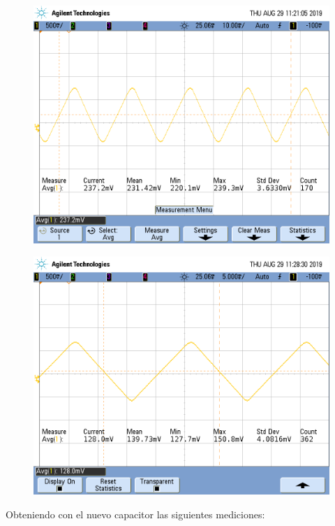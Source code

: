 \documentclass[a4paper]{article}
\begin{document}
\begin{figure}[H]
\centering
\begin{minipage}{.5\textwidth}
  \centering
  \includegraphics[width=.99\linewidth]{imagenes/RS2CORTOTL081.png}
  \label{fig:ib+TL}
\end{minipage}%
\begin{minipage}{.5\textwidth}
  \centering
  \includegraphics[width=.99\linewidth]{imagenes/RS1CORTOTL081.png}
  \label{fig:ib-TL}
\end{minipage}
\end{figure}
Obteniendo con el nuevo capacitor las siguientes mediciones:
\end{document}
